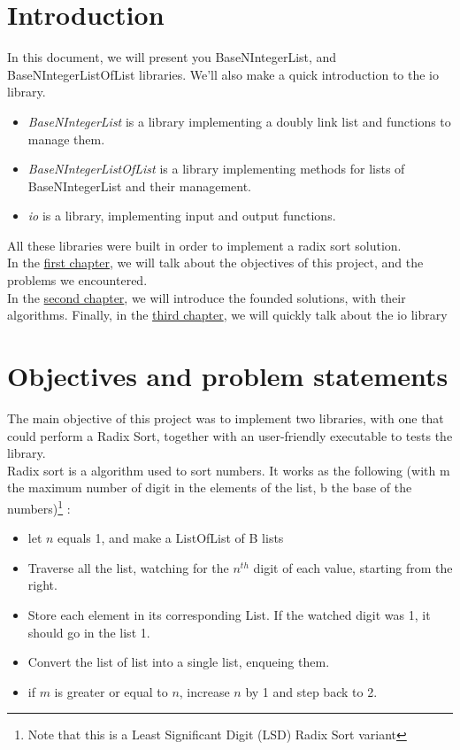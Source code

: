 \documentclass[book, backcover, english, nodocumentinfo]{upmethodology-document}
\begin{document}
\chapter*{Introduction}
In this document, we will present you BaseNIntegerList, and BaseNIntegerListOfList libraries. We'll also make a quick introduction to the io library.\\
\begin{itemize}
	\item{}   \textit{BaseNIntegerList} is a library implementing a doubly link list and functions to manage them.\\
	\item{}   \textit{BaseNIntegerListOfList} is a library implementing methods for lists of BaseNIntegerList and their management.\\
	\item{}   \textit{io} is a library, implementing input and output functions.\\
\end{itemize}

All these libraries were built in order to implement a radix sort solution.\\

In the \hyperref[chapter:Objectives]{first chapter}, we will talk about the objectives of this project, and the problems we encountered.\\
In the \hyperref[chapter:Algorithms]{second chapter}, we will introduce the founded solutions, with their algorithms.
Finally, in the \hyperref[chapter:IO-Lib]{third chapter}, we will quickly talk about  the io library

\tableofcontents{}

\chapter{Objectives and problem statements} \label{chapter:Objectives}
The main objective of this project was to implement two libraries, with one that could perform a Radix Sort, together with an user-friendly executable to tests the library.\\
Radix sort is a algorithm used to sort numbers. It works as the following (with m the maximum number of digit in the elements of the list, b the base of the numbers)\footnote{Note that this is a Least Significant Digit (LSD) Radix Sort variant} :\\
\begin{itemize}
	\item[1]{} let $n$ equals 1, and make a ListOfList of B lists
	\item[2]{} Traverse all the list, watching for the $n^{th}$ digit of each value, starting from the right.
	\item[3]{} Store each element in its corresponding List. If the watched digit was 1, it should go in the  list 1.
	\item[4]{} Convert the list of list into a single list, enqueing them.
	\item[5]{} if $m$ is greater or equal to $n$, increase $n$ by 1 and step back to 2.
\end{itemize}
\end{document}
